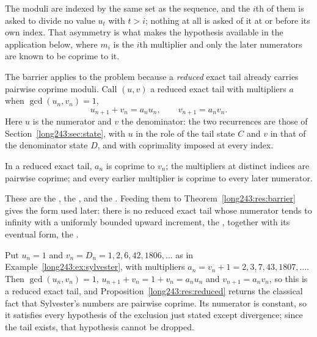 \documentclass[11pt]{article}
\begin{document}
The moduli are indexed by the same set as the sequence, and the $i$th of them
is asked to divide no value $u_t$ with $t>i$; nothing at all is asked of it at
or before its own index.  That asymmetry is what makes the hypothesis available
in the application below, where $m_i$ is the $i$th multiplier and only the
later numerators are known to be coprime to it.

The barrier applies to the problem because a \emph{reduced} exact tail already
carries pairwise coprime moduli.  Call $(u,v)$ a reduced exact tail with
multipliers $a$ when $\gcd(u_n,v_n)=1$,
\[
 u_{n+1}+v_n=a_nu_n,\qquad v_{n+1}=a_nv_n .
\]
Here $u$ is the numerator and $v$ the denominator: the two recurrences are
those of Section~\ref{long243:sec:state}, with $u$ in the role of the tail state $C$
and $v$ in that of the denominator state $D$, and with coprimality imposed at
every index.

\begin{proposition}\label{long243:res:reduced}
In a reduced exact tail, $a_n$ is coprime to $v_n$; the multipliers at distinct
indices are pairwise coprime; and every earlier multiplier is coprime to every
later numerator.
\end{proposition}

\noindent These are the
, the
, and the
.  Feeding them to Theorem~\ref{long243:res:barrier} gives the form used
later: there is no reduced exact tail whose numerator tends to infinity with a
uniformly bounded upward increment, the
, together with its eventual form, the
.

\begin{example}\label{long243:ex:reduced}
Put $u_n=1$ and $v_n=D_n=1,2,6,42,1806,\ldots$ as in
Example~\ref{long243:ex:sylvester}, with multipliers $a_n=v_n+1=2,3,7,43,1807,\ldots$.
Then $\gcd(u_n,v_n)=1$, $u_{n+1}+v_n=1+v_n=a_nu_n$ and $v_{n+1}=a_nv_n$, so
this is a reduced exact tail, and Proposition~\ref{long243:res:reduced} returns the
classical fact that Sylvester's numbers are pairwise coprime.  Its numerator is
constant, so it satisfies every hypothesis of the exclusion just stated except
divergence; since the tail exists, that hypothesis cannot be dropped.
\end{example}
\end{document}
